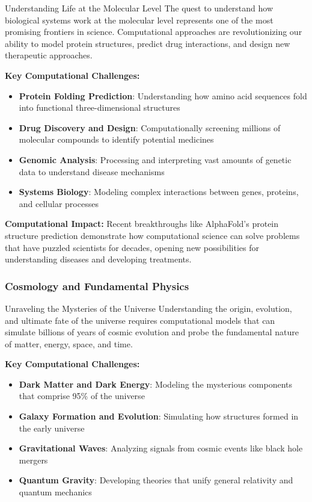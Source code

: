 \begin{highlightbox}{Understanding Life at the Molecular Level}
The quest to understand how biological systems work at the molecular level represents one of the most promising frontiers in science. Computational approaches are revolutionizing our ability to model protein structures, predict drug interactions, and design new therapeutic approaches.
\end{highlightbox}

\textbf{Key Computational Challenges:}
\begin{itemize}
    \item \textbf{Protein Folding Prediction}: Understanding how amino acid sequences fold into functional three-dimensional structures
    \item \textbf{Drug Discovery and Design}: Computationally screening millions of molecular compounds to identify potential medicines
    \item \textbf{Genomic Analysis}: Processing and interpreting vast amounts of genetic data to understand disease mechanisms
    \item \textbf{Systems Biology}: Modeling complex interactions between genes, proteins, and cellular processes
\end{itemize}

\textbf{Computational Impact:}
Recent breakthroughs like AlphaFold's protein structure prediction demonstrate how computational science can solve problems that have puzzled scientists for decades, opening new possibilities for understanding diseases and developing treatments.

\subsubsection{Cosmology and Fundamental Physics}

\begin{highlightbox}{Unraveling the Mysteries of the Universe}
Understanding the origin, evolution, and ultimate fate of the universe requires computational models that can simulate billions of years of cosmic evolution and probe the fundamental nature of matter, energy, space, and time.
\end{highlightbox}

\textbf{Key Computational Challenges:}
\begin{itemize}
    \item \textbf{Dark Matter and Dark Energy}: Modeling the mysterious components that comprise 95\% of the universe
    \item \textbf{Galaxy Formation and Evolution}: Simulating how structures formed in the early universe
    \item \textbf{Gravitational Waves}: Analyzing signals from cosmic events like black hole mergers
    \item \textbf{Quantum Gravity}: Developing theories that unify general relativity and quantum mechanics
\end{itemize}

